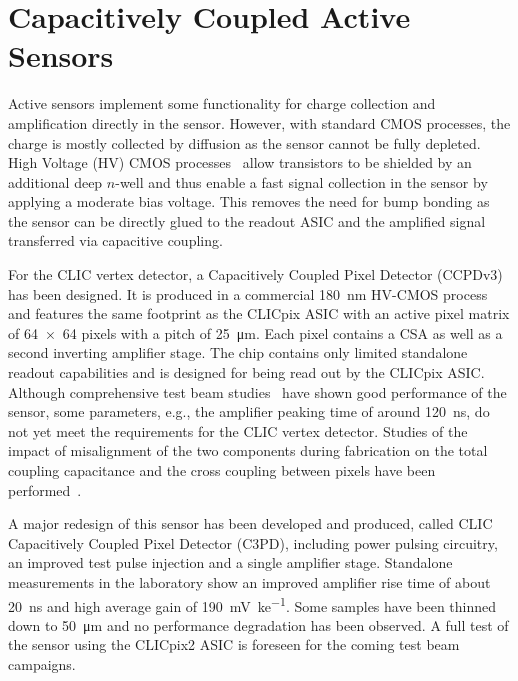 \documentclass[a4paper,11pt]{article}
\begin{document}
\section{Capacitively Coupled Active Sensors}
\label{sec:capacity}

Active sensors implement some functionality for charge collection and amplification directly in the sensor.
However, with standard CMOS processes, the charge is mostly collected by diffusion as the sensor cannot be fully depleted.
High Voltage (HV) CMOS processes~\cite{hvcmos} allow transistors to be shielded by an additional deep $n$-well and thus enable a fast signal collection in the sensor by applying a moderate bias voltage.
This removes the need for bump bonding as the sensor can be directly glued to the readout ASIC and the amplified signal transferred via capacitive coupling.

For the CLIC vertex detector, a Capacitively Coupled Pixel Detector (CCPDv3)~\cite{hvcmos2} has been designed. %
It is produced in a commercial \SI{180}{\nm} HV-CMOS process and features the same footprint as the CLICpix ASIC with an active pixel matrix of \num{64x64} pixels with a pitch of \SI{25}{\um}.
Each pixel contains a CSA as well as a second inverting amplifier stage.
The chip contains only limited standalone readout capabilities and is designed for being read out by the CLICpix ASIC.
Although comprehensive test beam studies~\cite{capacitively} have shown good performance of the sensor, some parameters, e.g., the amplifier peaking time of around \SI{120}{\ns}, do not yet meet the requirements for the CLIC vertex detector.
Studies of the impact of misalignment of the two components during fabrication on the total coupling capacitance and the cross coupling between pixels have been performed~\cite{daniel-vertex}.

A major redesign of this sensor has been developed and produced, called CLIC Capacitively Coupled Pixel Detector (C3PD), including power pulsing circuitry, an improved test pulse injection and a single amplifier stage.
Standalone measurements in the laboratory show an improved amplifier rise time of about \SI{20}{\ns} and high average gain of \SI{190}{\milli \V \per ke}.
Some samples have been thinned down to \SI{50}{\um} and no performance degradation has been observed.
A full test of the sensor using the CLICpix2 ASIC is foreseen for the coming test beam campaigns.
\end{document}
